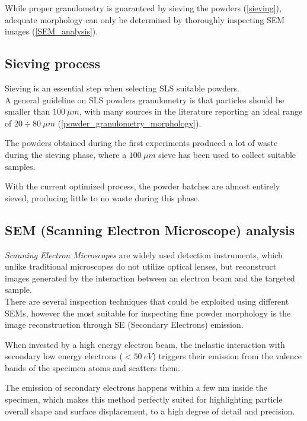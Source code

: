 \documentclass{article}
\begin{document}
    While proper granulometry is guaranteed by sieving the powders (\ref{sieving}), adequate morphology can only be 
    determined by thoroughly inspecting SEM images (\ref{SEM_analysis}). 
        \subsection{Sieving process\label{sieving}}

        Sieving is an essential step when selecting SLS suitable powders. \\ 

        A general guideline on SLS powders granulometry is that particles should be smaller than $100 \ \mu m$, with many 
        sources in the literature reporting an ideal range of $20 \div 80 \ \mu m$ (\ref{powder_granulometry_morphology}). 

        The powders obtained during the first experiments produced a lot of waste during the sieving phase, where a 
        $100 \ \mu m$ sieve has been used to collect suitable samples. 

        With the current optimized process, the powder batches are almost entirely sieved, producing little to no waste during this phase. 

    \clearpage
        \subsection{SEM (Scanning Electron Microscope) analysis\label{SEM_analysis}}

        \textit{Scanning Electron Microscopes} are widely used detection instruments, which unlike traditional microscopes 
        do not utilize optical lenses, but reconstruct images generated by the interaction between an electron beam and the targeted 
        sample. \\ 

        There are several inspection techniques that could be exploited using different SEMs, however the most suitable for inspecting 
        fine powder morphology is the image reconstruction through SE (Secondary Electrons) emission. 

        When invested by a high energy electron beam, the inelastic interaction with secondary low energy electrons ($< 50 \ eV$) triggers their emission from the valence bands of the specimen atoms and scatters them. 

        The emission of secondary electrons happens within a few nm inside the specimen, which makes this method perfectly suited 
        for highlighting particle overall shape and surface displacement, to a high degree of detail and precision. \\
\end{document}
